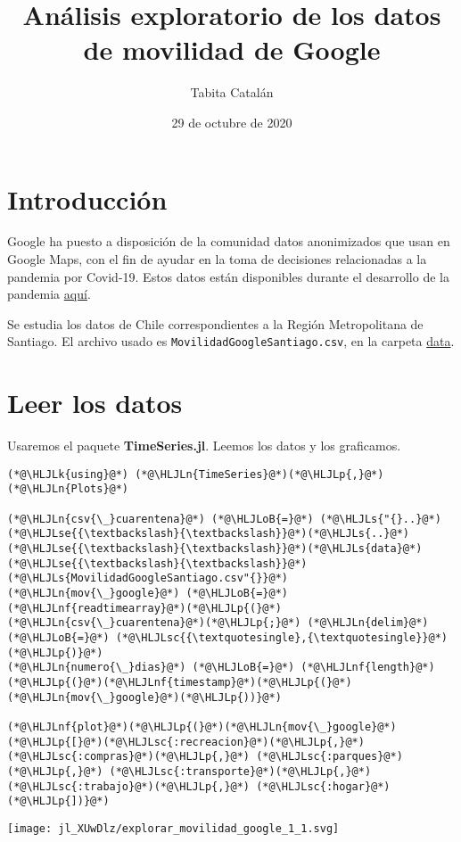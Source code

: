 \documentclass[12pt,a4paper]{article}
\title{ Análisis exploratorio de los datos de movilidad de Google }
\author{ Tabita Catalán }
\date{ 29 de octubre de 2020 }
\newcommand{\HLJLk}[1]{\textcolor[RGB]{148,91,176}{\textbf{#1}}}
\newcommand{\HLJLn}[1]{#1}
\newcommand{\HLJLnf}[1]{\textcolor[RGB]{66,102,213}{#1}}
\newcommand{\HLJLs}[1]{\textcolor[RGB]{201,61,57}{#1}}
\newcommand{\HLJLsc}[1]{\textcolor[RGB]{201,61,57}{#1}}
\newcommand{\HLJLse}[1]{\textcolor[RGB]{59,151,46}{#1}}
\newcommand{\HLJLoB}[1]{\textcolor[RGB]{102,102,102}{\textbf{#1}}}
\newcommand{\HLJLp}[1]{#1}
\begin{document}
\maketitle

\section{Introducción}
Google ha puesto a disposición de la comunidad datos anonimizados que usan en Google Maps, con el fin de ayudar en la toma de decisiones relacionadas a la pandemia por Covid-19. Estos datos están disponibles durante el desarrollo de la pandemia \href{https://www.google.com/covid19/mobility/}{aquí}.

Se estudia los datos de Chile correspondientes a la Región Metropolitana de Santiago. El archivo usado es \texttt{MovilidadGoogleSantiago.csv}, en la carpeta \href{../../data/}{data}.

\section{Leer los datos}
Usaremos el paquete \textbf{TimeSeries.jl}. Leemos los datos y los graficamos.


\begin{lstlisting}
(*@\HLJLk{using}@*) (*@\HLJLn{TimeSeries}@*)(*@\HLJLp{,}@*) (*@\HLJLn{Plots}@*)

(*@\HLJLn{csv{\_}cuarentena}@*) (*@\HLJLoB{=}@*) (*@\HLJLs{"{}..}@*)(*@\HLJLse{{\textbackslash}{\textbackslash}}@*)(*@\HLJLs{..}@*)(*@\HLJLse{{\textbackslash}{\textbackslash}}@*)(*@\HLJLs{data}@*)(*@\HLJLse{{\textbackslash}{\textbackslash}}@*)(*@\HLJLs{MovilidadGoogleSantiago.csv"{}}@*)
(*@\HLJLn{mov{\_}google}@*) (*@\HLJLoB{=}@*) (*@\HLJLnf{readtimearray}@*)(*@\HLJLp{(}@*)(*@\HLJLn{csv{\_}cuarentena}@*)(*@\HLJLp{;}@*) (*@\HLJLn{delim}@*) (*@\HLJLoB{=}@*) (*@\HLJLsc{{\textquotesingle},{\textquotesingle}}@*)(*@\HLJLp{)}@*)
(*@\HLJLn{numero{\_}dias}@*) (*@\HLJLoB{=}@*) (*@\HLJLnf{length}@*)(*@\HLJLp{(}@*)(*@\HLJLnf{timestamp}@*)(*@\HLJLp{(}@*)(*@\HLJLn{mov{\_}google}@*)(*@\HLJLp{))}@*)

(*@\HLJLnf{plot}@*)(*@\HLJLp{(}@*)(*@\HLJLn{mov{\_}google}@*)(*@\HLJLp{[}@*)(*@\HLJLsc{:recreacion}@*)(*@\HLJLp{,}@*) (*@\HLJLsc{:compras}@*)(*@\HLJLp{,}@*) (*@\HLJLsc{:parques}@*)(*@\HLJLp{,}@*) (*@\HLJLsc{:transporte}@*)(*@\HLJLp{,}@*) (*@\HLJLsc{:trabajo}@*)(*@\HLJLp{,}@*) (*@\HLJLsc{:hogar}@*)(*@\HLJLp{])}@*)
\end{lstlisting}

\texttt{[image: jl\_XUwDlz/explorar\_movilidad\_google\_1\_1.svg]}
\end{document}
